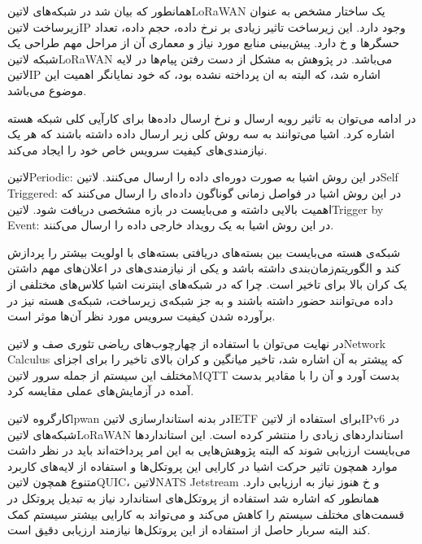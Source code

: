 
همانطور که بیان شد در شبکه‌های ‌لاتین{LoRaWAN} یک ساختار مشخص به عنوان زیرساخت ‌لاتین{IP} وجود دارد.
این زیرساخت تاثیر زیادی بر نرخ داده، حجم داده، تعداد حسگرها و ‌خ دارد. پیش‌بینی منابع مورد نیاز و معماری آن از مراحل مهم طراحی یک شبکه ‌لاتین{LoRaWAN} می‌باشد.
در پژوهش  به مشکل از دست رفتن پیام‌ها در لایه ‌لاتین{IP} اشاره شد، که البته به ان پرداخته نشده بود، که خود نمایانگر اهمیت این موضوع می‌باشد.

در ادامه می‌توان به تاثیر رویه ارسال و نرخ ارسال داده‌ها برای کارآیی کلی شبکه هسته اشاره کرد.
اشیا می‌توانند به سه روش کلی زیر ارسال داده داشته باشند که هر یک نیازمندی‌های کیفیت سرویس خاص خود را ایجاد می‌کند.

 ‌لاتین{Periodic}: در این روش اشیا به صورت دوره‌ای داده را ارسال می‌کنند.
 ‌لاتین{Self Triggered}: در این روش اشیا در فواصل زمانی گوناگون داده‌ای را ارسال می‌کنند که اهمیت بالایی داشته و می‌بایست در بازه مشخصی دریافت شود.
 ‌لاتین{Trigger by Event}: در این روش اشیا به یک رویداد خارجی داده را ارسال می‌کنند.

شبکه‌ی هسته می‌بایست بین بسته‌های دریافتی بسته‌های با اولویت بیشتر را پردازش کند و الگوریتم‌زمان‌بندی داشته باشد و یکی از نیازمندی‌های در اعلان‌های مهم داشتن یک کران بالا برای تاخیر است.
چرا که در شبکه‌های اینترنت اشیا کلاس‌های مختلفی از داده می‌توانند حضور داشته باشند و به جز شبکه‌ی زیرساخت، شبکه‌ی هسته نیز در برآورده شدن کیفیت سرویس مورد نظر آن‌ها موثر است.

در نهایت می‌توان با استفاده از چهارچوب‌های ریاضی تئوری صف و ‌لاتین{Network Calculus} که پیشتر به آن اشاره شد،
تاخیر میانگین و کران بالای تاخیر را برای اجزای مختلف این سیستم از جمله
سرور ‌لاتین{MQTT} بدست آورد و آن را با مقادیر بدست آمده در آزمایش‌های عملی
مقایسه کرد.


کارگروه ‌لاتین{lpwan} در بدنه استاندارسازی ‌لاتین{IETF} برای استفاده از ‌لاتین{IPv6} در شبکه‌های ‌لاتین{LoRaWAN} استانداردهای زیادی را منتشر کرده است.
این استانداردها می‌بایست ارزیابی شوند که البته پژوهش‌هایی به این امر پرداخته‌اند باید در نظر داشت موارد همچون تاثیر حرکت اشیا در کارایی این پروتکل‌ها و استفاده از لایه‌های کاربرد متنوع همچون ‌لاتین{QUIC}، ‌لاتین{NATS Jetstream} و ‌خ هنوز نیاز به ارزیابی دارد.
همانطور که اشاره شد استفاده از پروتکل‌های استاندارد نیاز به تبدیل پروتکل در قسمت‌های مختلف سیستم را کاهش می‌کند و می‌تواند به کارایی بیشتر سیستم کمک کند البته سربار حاصل از استفاده از این پروتکل‌ها نیازمند ارزیابی دقیق است.

